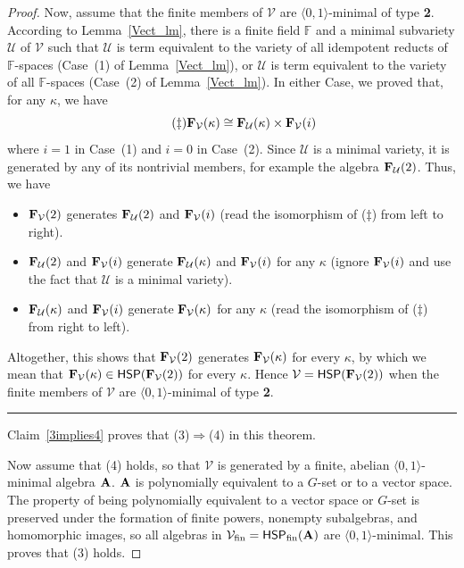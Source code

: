 \documentclass[12pt]{amsart}
\theoremstyle{definition}
\numberwithin{equation}{section}
\newcommand{\cqed}{\hfill\rule{1.3mm}{3mm}}
\newcommand{\m}[1]{{\mathbf{\uppercase{#1}}}}
\begin{document}
\begin{proof}
Now, assume that 
the finite members of $\mathcal{V}$
are $\langle 0,1\rangle$-minimal of type {\bf 2}.
According to Lemma~\ref{Vect_lm}, there is a finite
field $\mathbb{F}$ and a minimal subvariety $\mathcal{U}$
of $\mathcal{V}$
such that  $\mathcal{U}$ is term equivalent to the variety of
all idempotent reducts of $\mathbb{F}$-spaces (Case~(1) of
Lemma~\ref{Vect_lm}), or 
$\mathcal{U}$ is term equivalent to the variety of
all $\mathbb{F}$-spaces (Case~(2) of
Lemma~\ref{Vect_lm}). In either Case, we proved
that, for any $\kappa$, we have
\[
\tag{$\ddagger$}
\m f_{\mathcal{V}}(\kappa)\cong \m f_{\mathcal{U}}(\kappa)
\times \m f_{\mathcal{V}}(i)
\]
where $i=1$ in Case~(1) and $i=0$ in Case~(2).
Since $\mathcal{U}$ is a minimal variety,
it is generated by any of its nontrivial members,
for example the algebra $\m f_{\mathcal{U}}(2)$.
Thus, we have
\begin{itemize}
\item $\m f_{\mathcal{V}}(2)$ generates $\m f_{\mathcal{U}}(2)$ and
  $\m f_{\mathcal{V}}(i)$ (read the isomorphism of ($\ddagger$)
  from left to right).
\item  $\m f_{\mathcal{U}}(2)$ and
  $\m f_{\mathcal{V}}(i)$ generate
  $\m f_{\mathcal{U}}(\kappa)$ and
  $\m f_{\mathcal{V}}(i)$ for any $\kappa$
  (ignore $\m f_{\mathcal{V}}(i)$ and use the
  fact that $\mathcal{U}$ is a minimal variety).
\item   $\m f_{\mathcal{U}}(\kappa)$ and
  $\m f_{\mathcal{V}}(i)$ generate  $\m f_{\mathcal{V}}(\kappa)$
  for any $\kappa$ (read the isomorphism of ($\ddagger$)
  from right to left).
\end{itemize}
Altogether, this shows that $\m f_{\mathcal{V}}(2)$
generates $\m f_{\mathcal{V}}(\kappa)$ for every $\kappa$,
by which we mean that
$\m f_{\mathcal{V}}(\kappa)\in\mathsf{H}\mathsf{S}\mathsf{P}(\m f_{\mathcal{V}}(2))$ for every $\kappa$. Hence 
$\mathcal{V}=\mathsf{H}\mathsf{S}\mathsf{P}(\m f_{\mathcal{V}}(2))$
when 
the finite members of $\mathcal{V}$
are $\langle 0,1\rangle$-minimal of type {\bf 2}.
\cqed
\bigskip

Claim~\ref{3implies4} proves that (3)$\Rightarrow$(4)
in this theorem.

Now assume that (4) holds, so that
$\mathcal V$ is generated by a finite, abelian
$\langle 0,1\rangle$-minimal
algebra $\m a$.
$\m a$ is polynomially equivalent to a $G$-set or to a
vector space. The property
of being polynomially equivalent
to a vector space or $G$-set is preserved
under the formation of finite powers,
nonempty subalgebras, and homomorphic images,
so all algebras in ${\mathcal V}_{\textrm{fin}}=
\mathsf{H}\mathsf{S}\mathsf{P}_{\textrm{fin}}(\m a)$
are $\langle 0,1\rangle$-minimal. This proves that (3) holds.
\end{proof}
\end{document}
